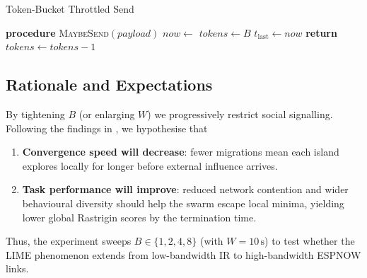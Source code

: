\documentclass[conference]{IEEEtran}
\begin{document}
\begin{algorithm}[H]
\caption{Token-Bucket Throttled Send}
\label{alg:token_bucket}
\begin{algorithmic}[1]
\State \textbf{procedure} \textsc{MaybeSend}$(\mathit{payload})$
\State $now \gets$ 
               
    \State $\mathit{tokens} \gets B$
    \State $t_{\mathrm{last}} \gets now$
\EndIf
{}
    \State \textbf{return}   
\EndIf
{}
    \State $\mathit{tokens} \gets \mathit{tokens} - 1$
    \State {}
\EndIf
\end{algorithmic}
\end{algorithm}

\subsection{Rationale and Expectations}

By tightening $B$ (or enlarging $W$) we progressively restrict social signalling.  
Following the findings in \cite{aust2022hidden}, we hypothesise that

\begin{enumerate}
  \item \textbf{Convergence speed will decrease}: fewer migrations mean each island explores locally for longer before external influence arrives.
  \item \textbf{Task performance will improve}: reduced network contention and wider behavioural diversity should help the swarm escape local minima, yielding lower global Rastrigin scores by the termination time.
\end{enumerate}

Thus, the experiment sweeps $B\in\{1,2,4,8\}$ (with $W=10\,\mathrm{s}$) to test whether the LIME phenomenon extends from low-bandwidth IR to high-bandwidth ESPNOW links.





\newpage
\printbibliography
\end{document}

